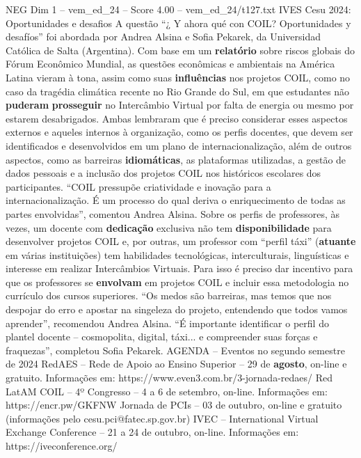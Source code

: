 \begin{textsample}{NEG Dim 1 – vem\_ed\_24 – Score 4.00 – vem\_ed\_24/t127.txt}  \label{ex:f1_neg_132}
IVES Cesu 2024: Oportunidades e desafios A questão “¿ Y ahora qué con COIL?
Oportunidades y desafíos” foi abordada por Andrea Alsina e Sofia Pekarek, da Universidad Católica de Salta (Argentina).
Com base em um \textbf{relatório} sobre riscos globais do Fórum Econômico Mundial, as questões econômicas e ambientais na América Latina vieram à tona, assim como suas \textbf{influências} nos projetos COIL, como no caso da tragédia climática recente no Rio Grande do Sul, em que estudantes não \textbf{puderam} \textbf{prosseguir} no Intercâmbio Virtual por falta de energia ou mesmo por estarem desabrigados.
Ambas lembraram que é preciso considerar esses aspectos externos e aqueles internos à organização, como os perfis docentes, que devem ser identificados e desenvolvidos em um plano de internacionalização, além de outros aspectos, como as barreiras \textbf{idiomáticas}, as plataformas utilizadas, a gestão de dados pessoais e a inclusão dos projetos COIL nos históricos escolares dos participantes. “COIL pressupõe criatividade e inovação para a internacionalização.
É um processo do qual deriva o enriquecimento de todas as partes envolvidas”, comentou Andrea Alsina.
Sobre os perfis de professores, às vezes, um docente com \textbf{dedicação} exclusiva não tem \textbf{disponibilidade} para desenvolver projetos COIL e, por outras, um professor com “perfil táxi” (\textbf{atuante} em várias instituições) tem habilidades tecnológicas, interculturais, linguísticas e interesse em realizar Intercâmbios Virtuais.
Para isso é preciso dar incentivo para que os professores se \textbf{envolvam} em projetos COIL e incluir essa metodologia no currículo dos cursos superiores. “Os medos são barreiras, mas temos que nos despojar do erro e apostar na singeleza do projeto, entendendo que todos vamos aprender”, recomendou Andrea Alsina. “É importante identificar o perfil do plantel docente – cosmopolita, digital, táxi... e compreender suas forças e fraquezas”, completou Sofia Pekarek.
AGENDA – Eventos no segundo semestre de 2024 RedAES – Rede de Apoio ao Ensino Superior – 29 de \textbf{agosto}, on-line e gratuito.
Informações em: https://www.even3.com.br/3-jornada-redaes/ Red LatAM COIL – 4º Congresso – 4 a 6 de setembro, on-line.
Informações em: https://encr.pw/GKFNW Jornada de PCIs – 03 de outubro, on-line e gratuito (informações pelo cesu.pci@fatec.sp.gov.br) IVEC – International Virtual Exchange Conference – 21 a 24 de outubro, on-line.
Informações em: https://iveconference.org/

\end{textsample}
